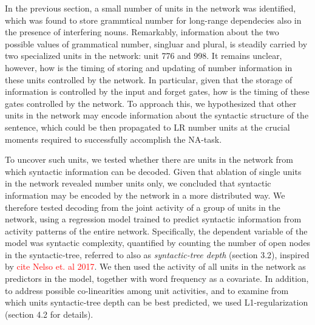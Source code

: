 In the previous section, a small number of units in the network was identified, which was found to store grammtical number for long-range dependecies also in the presence of interfering nouns. Remarkably, information about the two possible values of grammatical number, singluar and plural, is steadily carried by two specialized units in the network: unit 776 and 998. It remains unclear, however, how is the timing of storing and updating of number information in these units controlled by the network. In particular, given that the storage of information is controlled by the input and forget gates, how is the timing of these gates controlled by the network. To approach this, we hypothesized that other units in the network may encode information about the syntactic structure of the sentence, which could be then propagated to LR number units at the crucial moments required to successfully accomplish the NA-task. 

To uncover such units, we tested whether there are units in the network from which syntactic information can be decoded. Given that ablation of single units in the network revealed number units only, we concluded that syntactic information may be encoded by the network in a more distributed way. We therefore tested decoding from the joint activity of a group of units in the network, using a regression model trained to predict syntactic information from activity patterns of the entire network. Specifically, the dependent variable of the model was syntactic complexity, quantified by counting the number of open nodes in the syntactic-tree, referred to also as \textit{syntactic-tree depth} (section 3.2), inspired by \textcolor{red}{cite Nelso et. al 2017}. We then used the activity of all units in the network as predictors in the model, together with word frequency as a covariate. In addition, to address possible co-linearities among unit activities, and to examine from which units syntactic-tree depth can be best predicted, we used L1-regularization (section 4.2 for details). 

